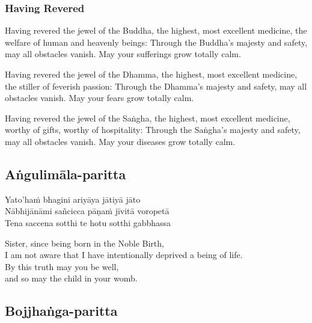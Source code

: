 \subsubsection{Having Revered}



Having revered the jewel of the Buddha, the highest, most excellent medicine,
the welfare of human and heavenly beings: Through the Buddha's majesty and
safety, may all obstacles vanish. May your sufferings grow totally calm.

Having revered the jewel of the Dhamma, the highest, most excellent medicine,
the stiller of feverish passion: Through the Dhamma's majesty and safety, may
all obstacles vanish. May your fears grow totally calm.

Having revered the jewel of the Saṅgha, the highest, most excellent medicine,
worthy of gifts, worthy of hospitality: Through the Saṅgha's majesty and safety,
may all obstacles vanish. May your diseases grow totally calm.

\subsection{Aṅgulimāla-paritta}
\label{yato-ham-bhagini}


\begin{paritta}
Yato'haṁ bhagini ariyāya jātiyā jāto\\
Nābhijānāmi sañcicca pāṇaṁ jīvitā voropetā\\
Tena saccena sotthi te hotu sotthi gabbhassa 
\end{paritta}



\begin{english}
  Sister, since being born in the Noble Birth,\\
  I am not aware that I have intentionally deprived a being of life.\\
  By this truth may you be well,\\
  and so may the child in your womb.
\end{english}

\subsection{Bojjhaṅga-paritta}
\label{bojjhango}

